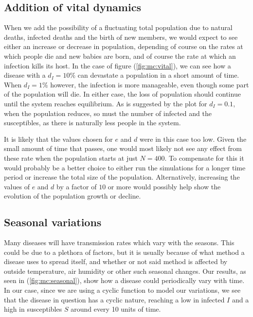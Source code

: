 \documentclass[../main.tex]{subfiles}
\begin{document}
\subsection{Addition of vital dynamics}
When we add the possibility of a fluctuating total population due to natural deaths, infected deaths and the birth of new members, we would expect to see either an increase or decrease in population, depending of course on the rates at which people die and new babies are born, and of course the rate at which an infection kills its host. In the case of figure (\ref{fig:mc:vital}), we can see how a disease with a $d_I = 10\%$ can devastate a population in a short amount of time. When $d_I = 1\%$ however, the infection is more manageable, even though some part of the population will die. In either case, the loss of population should continue until the system reaches equilibrium. As is suggested by the plot for $d_I = 0.1$, when the population reduces, so must the number of infected and the susceptibles, as there is naturally less people in the system.

It is likely that the values chosen for $e$ and $d$ were in this case too low. Given the small amount of time that passes, one would most likely not see any effect from these rate when the population starts at just $N = 400$. To compensate for this it would probably be a better choice to either run the simulations for a longer time period or increase the total size of the population. Alternatively, increasing the values of $e$ and $d$ by a factor of $10$ or more would possibly help show the evolution of the population growth or decline.  

\subsection{Seasonal variations}
Many diseases will have transmission rates which vary with the seasons. This could be due to a plethora of factors, but it is usually because of what method a disease uses to spread itself, and whether or not said method is affected by outside temperature, air humidity or other such seasonal changes.  Our results, as seen in (\ref{fig:mc:seasonal}), show how a disease could periodically vary with time. In our case, since we are using a cyclic function to model our variations, we see that the disease in question has a cyclic nature, reaching a low in infected $I$ and a high in susceptibles $S$ around every 10 units of time. 
\end{document}
